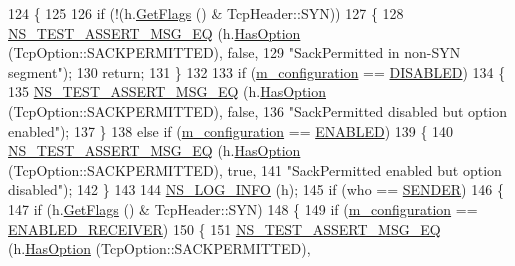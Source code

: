 \begin{DoxyCode}
124 \{
125 
126   \textcolor{keywordflow}{if} (!(h.\hyperlink{classns3_1_1TcpHeader_a0d04c5620ee147d4e01d56b9530e8db1}{GetFlags} () & TcpHeader::SYN))
127     \{
128       \hyperlink{group__testing_ga2a9d78cffb3db8e867c35fff0b698cf5}{NS\_TEST\_ASSERT\_MSG\_EQ} (h.\hyperlink{classns3_1_1TcpHeader_aacc07bdab91925f1cddf9bcb1ae91d13}{HasOption} (TcpOption::SACKPERMITTED), \textcolor{keyword}{false},
129                              \textcolor{stringliteral}{"SackPermitted in non-SYN segment"});
130       \textcolor{keywordflow}{return};
131     \}
132 
133   \textcolor{keywordflow}{if} (\hyperlink{classSackPermittedTestCase_aff7ae43e44e4fb3f7286e9d3083f2732}{m\_configuration} == \hyperlink{classSackPermittedTestCase_a2dc95ae5e965bc36df7ea84c64723493ac7dca56a5fac1080b2ee4d83cfa2005e}{DISABLED})
134     \{
135       \hyperlink{group__testing_ga2a9d78cffb3db8e867c35fff0b698cf5}{NS\_TEST\_ASSERT\_MSG\_EQ} (h.\hyperlink{classns3_1_1TcpHeader_aacc07bdab91925f1cddf9bcb1ae91d13}{HasOption} (TcpOption::SACKPERMITTED), \textcolor{keyword}{false},
136                              \textcolor{stringliteral}{"SackPermitted disabled but option enabled"});
137     \}
138   \textcolor{keywordflow}{else} \textcolor{keywordflow}{if} (\hyperlink{classSackPermittedTestCase_aff7ae43e44e4fb3f7286e9d3083f2732}{m\_configuration} == \hyperlink{classSackPermittedTestCase_a2dc95ae5e965bc36df7ea84c64723493a895f2f11241beaf1334839f4056a0531}{ENABLED})
139     \{
140       \hyperlink{group__testing_ga2a9d78cffb3db8e867c35fff0b698cf5}{NS\_TEST\_ASSERT\_MSG\_EQ} (h.\hyperlink{classns3_1_1TcpHeader_aacc07bdab91925f1cddf9bcb1ae91d13}{HasOption} (TcpOption::SACKPERMITTED), \textcolor{keyword}{true},
141                              \textcolor{stringliteral}{"SackPermitted enabled but option disabled"});
142     \}
143 
144   \hyperlink{group__logging_gafbd73ee2cf9f26b319f49086d8e860fb}{NS\_LOG\_INFO} (h);
145   \textcolor{keywordflow}{if} (who == \hyperlink{classns3_1_1TcpGeneralTest_a29338e6b7137cad650c2ff835713f6eea5400e3d6b26928cf9e67ebb026462256}{SENDER})
146     \{
147       \textcolor{keywordflow}{if} (h.\hyperlink{classns3_1_1TcpHeader_a0d04c5620ee147d4e01d56b9530e8db1}{GetFlags} () & TcpHeader::SYN)
148         \{
149           \textcolor{keywordflow}{if} (\hyperlink{classSackPermittedTestCase_aff7ae43e44e4fb3f7286e9d3083f2732}{m\_configuration} == \hyperlink{classSackPermittedTestCase_a2dc95ae5e965bc36df7ea84c64723493a3c0e8b65f47a69fca9d52f403274742c}{ENABLED\_RECEIVER})
150             \{
151               \hyperlink{group__testing_ga2a9d78cffb3db8e867c35fff0b698cf5}{NS\_TEST\_ASSERT\_MSG\_EQ} (h.\hyperlink{classns3_1_1TcpHeader_aacc07bdab91925f1cddf9bcb1ae91d13}{HasOption} (TcpOption::SACKPERMITTED), \textcolor{keyword}{
}
\end{DoxyCode}
